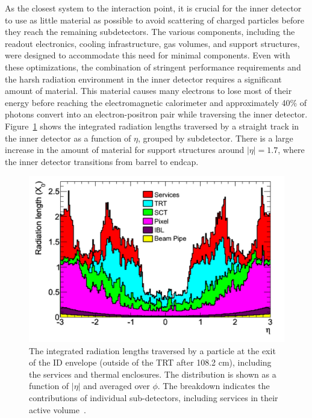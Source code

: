 As the closest system to the interaction point, it is crucial for the inner detector to use as little material as possible to avoid scattering of charged particles before they reach the remaining subdetectors.
The various components, including the readout electronics, cooling infrastructure, gas volumes, and support structures,  were designed to accommodate this need for minimal components.
Even with these optimizations, the combination of stringent performance requirements and the harsh radiation environment in the inner detector requires a significant amount of material.
This material causes many electrons to lose most of their energy before reaching the electromagnetic calorimeter and approximately 40\% of photons convert into an electron-positron pair while traversing the inner detector.
Figure~\ref{fig:id_material} shows the integrated radiation lengths traversed by a straight track in the inner detector as a function of $\eta$, grouped by subdetector.
There is a large increase in the amount of material for support structures around $|\eta| = 1.7$, where the inner detector transitions from barrel to endcap.


\begin{figure}
\centering
\includegraphics[width=\fullfig]{figures/id_material_subdetector.png}
\caption{The integrated radiation lengths traversed by a particle at the exit of the ID envelope (outside of the \acs*{TRT} after 108.2 cm), including the services and thermal enclosures. The distribution is shown as a function of $|\eta|$ and averaged over $\phi$. The breakdown indicates the contributions of individual sub-detectors, including services in their active volume~\cite{atlas_experiment}.}
\label{fig:id_material}
\end{figure}

